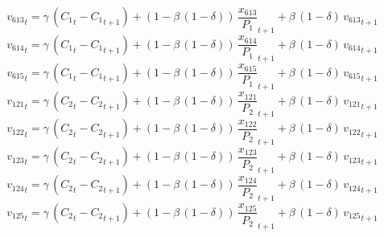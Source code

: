 \begin{dmath}
{{v_{613}}}_{t}={{\gamma}}\, \left({{C_{1}}}_{t}-{{C_{1}}}_{t+1}\right)+\left(1-{{\beta}}\, \left(1-{{\delta}}\right)\right)\, {{\frac{x_{613}}{P_{1}}}}_{t+1}+{{\beta}}\, \left(1-{{\delta}}\right)\, {{v_{613}}}_{t+1}
\end{dmath}
\begin{dmath}
{{v_{614}}}_{t}={{\gamma}}\, \left({{C_{1}}}_{t}-{{C_{1}}}_{t+1}\right)+\left(1-{{\beta}}\, \left(1-{{\delta}}\right)\right)\, {{\frac{x_{614}}{P_{1}}}}_{t+1}+{{\beta}}\, \left(1-{{\delta}}\right)\, {{v_{614}}}_{t+1}
\end{dmath}
\begin{dmath}
{{v_{615}}}_{t}={{\gamma}}\, \left({{C_{1}}}_{t}-{{C_{1}}}_{t+1}\right)+\left(1-{{\beta}}\, \left(1-{{\delta}}\right)\right)\, {{\frac{x_{615}}{P_{1}}}}_{t+1}+{{\beta}}\, \left(1-{{\delta}}\right)\, {{v_{615}}}_{t+1}
\end{dmath}
\begin{dmath}
{{v_{121}}}_{t}={{\gamma}}\, \left({{C_{2}}}_{t}-{{C_{2}}}_{t+1}\right)+\left(1-{{\beta}}\, \left(1-{{\delta}}\right)\right)\, {{\frac{x_{121}}{P_{2}}}}_{t+1}+{{\beta}}\, \left(1-{{\delta}}\right)\, {{v_{121}}}_{t+1}
\end{dmath}
\begin{dmath}
{{v_{122}}}_{t}={{\gamma}}\, \left({{C_{2}}}_{t}-{{C_{2}}}_{t+1}\right)+\left(1-{{\beta}}\, \left(1-{{\delta}}\right)\right)\, {{\frac{x_{122}}{P_{2}}}}_{t+1}+{{\beta}}\, \left(1-{{\delta}}\right)\, {{v_{122}}}_{t+1}
\end{dmath}
\begin{dmath}
{{v_{123}}}_{t}={{\gamma}}\, \left({{C_{2}}}_{t}-{{C_{2}}}_{t+1}\right)+\left(1-{{\beta}}\, \left(1-{{\delta}}\right)\right)\, {{\frac{x_{123}}{P_{2}}}}_{t+1}+{{\beta}}\, \left(1-{{\delta}}\right)\, {{v_{123}}}_{t+1}
\end{dmath}
\begin{dmath}
{{v_{124}}}_{t}={{\gamma}}\, \left({{C_{2}}}_{t}-{{C_{2}}}_{t+1}\right)+\left(1-{{\beta}}\, \left(1-{{\delta}}\right)\right)\, {{\frac{x_{124}}{P_{2}}}}_{t+1}+{{\beta}}\, \left(1-{{\delta}}\right)\, {{v_{124}}}_{t+1}
\end{dmath}
\begin{dmath}
{{v_{125}}}_{t}={{\gamma}}\, \left({{C_{2}}}_{t}-{{C_{2}}}_{t+1}\right)+\left(1-{{\beta}}\, \left(1-{{\delta}}\right)\right)\, {{\frac{x_{125}}{P_{2}}}}_{t+1}+{{\beta}}\, \left(1-{{\delta}}\right)\, {{v_{125}}}_{t+1}
\end{dmath}
